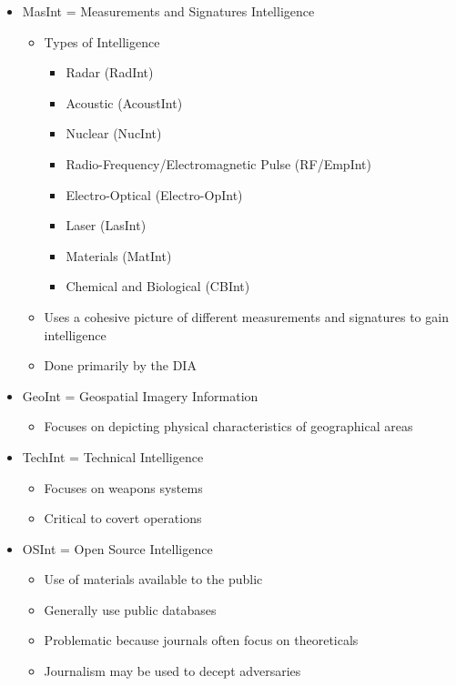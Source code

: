 \documentclass[11pt]{article}
\begin{document}
\begin{itemize}
\begin{itemize}
\end{itemize}
\item MasInt = Measurements and Signatures Intelligence
\begin{itemize}
\item Types of Intelligence
\begin{itemize}
\item Radar (RadInt)
\item Acoustic (AcoustInt)
\item Nuclear (NucInt)
\item Radio-Frequency/Electromagnetic Pulse (RF/EmpInt)
\item Electro-Optical (Electro-OpInt)
\item Laser (LasInt)
\item Materials (MatInt)
\item Chemical and Biological (CBInt)
\end{itemize}
\item Uses a cohesive picture of different measurements and signatures to gain intelligence
\item Done primarily by the DIA
\end{itemize}
\item GeoInt = Geospatial Imagery Information
\begin{itemize}
\item Focuses on depicting physical characteristics of geographical areas
\end{itemize}
\item TechInt = Technical Intelligence
\begin{itemize}
\item Focuses on weapons systems
\item Critical to covert operations
\end{itemize}
\item OSInt = Open Source Intelligence
\begin{itemize}
\item Use of materials available to the public
\item Generally use public databases
\item Problematic because journals often focus on theoreticals
\item Journalism may be used to decept adversaries
\end{itemize}
\end{itemize}
\end{document}
